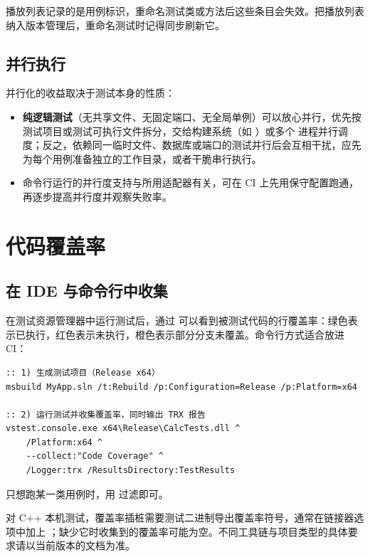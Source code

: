 \begin{warnbox}[注意]
播放列表记录的是用例标识，重命名测试类或方法后这些条目会失效。把播放列表纳入版本管理后，重命名测试时记得同步刷新它。
\end{warnbox}

\subsection{并行执行}

并行化的收益取决于测试本身的性质：

\begin{itemize}
  \item \textbf{纯逻辑测试}（无共享文件、无固定端口、无全局单例）可以放心并行，优先按测试项目或测试可执行文件拆分，交给构建系统（如 ）或多个  进程并行调度；反之，依赖同一临时文件、数据库或端口的测试并行后会互相干扰，应先为每个用例准备独立的工作目录，或者干脆串行执行。
  \item 命令行运行的并行度支持与所用适配器有关，可在 CI 上先用保守配置跑通，再逐步提高并行度并观察失败率。
\end{itemize}

\section{代码覆盖率}

\subsection{在 IDE 与命令行中收集}

在测试资源管理器中运行测试后，通过  可以看到被测试代码的行覆盖率：绿色表示已执行，红色表示未执行，橙色表示部分分支未覆盖。命令行方式适合放进 CI：

\begin{lstlisting}[style=shellstyle]
:: 1) 生成测试项目（Release x64）
msbuild MyApp.sln /t:Rebuild /p:Configuration=Release /p:Platform=x64

:: 2) 运行测试并收集覆盖率，同时输出 TRX 报告
vstest.console.exe x64\Release\CalcTests.dll ^
    /Platform:x64 ^
    --collect:"Code Coverage" ^
    /Logger:trx /ResultsDirectory:TestResults
\end{lstlisting}

只想跑某一类用例时，用  过滤即可。

\begin{warnbox}[注意]
对 C++ 本机测试，覆盖率插桩需要测试二进制导出覆盖率符号，通常在链接器选项中加上 ；缺少它时收集到的覆盖率可能为空。不同工具链与项目类型的具体要求请以当前版本的文档为准。
\end{warnbox}

